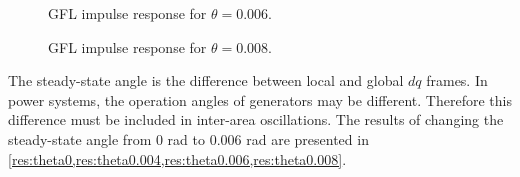 \begin{figure}[ht]
\begin{center}
    \centering
   \nonindent
	\caption[GFL impulse response for $\theta=0.006$]{GFL impulse response for $\theta=0.006$.}
	\label{res:theta0.006}
	\end{center}
\end{figure}

\begin{figure}[ht]
\begin{center}
    \centering
   \nonindent
	\caption[GFL impulse response for $\theta=0.008$]{GFL impulse response for $\theta=0.008$.}
	\label{res:theta0.008}
	\end{center}
\end{figure}
The steady-state angle is the difference between local and global $dq$ frames. In power systems, the operation angles of generators may be different. Therefore this difference must be included in inter-area oscillations. The results of changing the steady-state angle from $0$ rad to $0.006$ rad are presented in \cref{res:theta0,res:theta0.004,res:theta0.006,res:theta0.008}.

